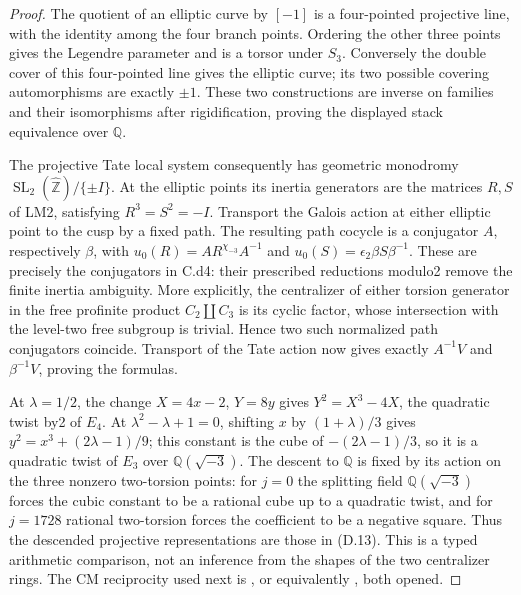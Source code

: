 \begin{proof}
The quotient of an elliptic curve by $[-1]$ is a four-pointed projective line, with the identity among the four branch points. Ordering the other three points gives the Legendre parameter and is a torsor under $S_3$. Conversely the double cover of this four-pointed line gives the elliptic curve; its two possible covering automorphisms are exactly $\pm1$. These two constructions are inverse on families and their isomorphisms after rigidification, proving the displayed stack equivalence over $\mathbb Q$.

The projective Tate local system consequently has geometric monodromy $\operatorname{SL}_2(\widehat{\mathbb Z})/\{\pm I\}$. At the elliptic points its inertia generators are the matrices $R,S$ of LM2, satisfying $R^3=S^2=-I$. Transport the Galois action at either elliptic point to the cusp by a fixed path. The resulting path cocycle is a conjugator $A$, respectively $\beta$, with
$u_0(R)=AR^{\chi_{-3}}A^{-1}$ and
$u_0(S)=\epsilon_2\beta S\beta^{-1}$. These are precisely the conjugators in C.d4: their prescribed reductions modulo2 remove the finite inertia ambiguity. More explicitly, the centralizer of either torsion generator in the free profinite product $C_2\amalg C_3$ is its cyclic factor, whose intersection with the level-two free subgroup is trivial. Hence two such normalized path conjugators coincide. Transport of the Tate action now gives exactly $A^{-1}V$ and $\beta^{-1}V$, proving the formulas.

At $\lambda=1/2$, the change $X=4x-2$, $Y=8y$ gives $Y^2=X^3-4X$, the quadratic twist by2 of $E_4$. At $\lambda^2-\lambda+1=0$, shifting $x$ by $(1+\lambda)/3$ gives $y^2=x^3+(2\lambda-1)/9$; this constant is the cube of $-(2\lambda-1)/3$, so it is a quadratic twist of $E_3$ over $\mathbb Q(\sqrt{-3})$. The descent to $\mathbb Q$ is fixed by its action on the three nonzero two-torsion points: for $j=0$ the splitting field $\mathbb Q(\sqrt{-3})$ forces the cubic constant to be a rational cube up to a quadratic twist, and for $j=1728$ rational two-torsion forces the coefficient to be a negative square. Thus the descended projective representations are those in (D.13). This is a typed arithmetic comparison, not an inference from the shapes of the two centralizer rings. The CM reciprocity used next is \cite[Corollary3.4]{dLozano2022}, or equivalently \cite[Theorem3.10]{dMilne2007}, both opened.
\end{proof}

